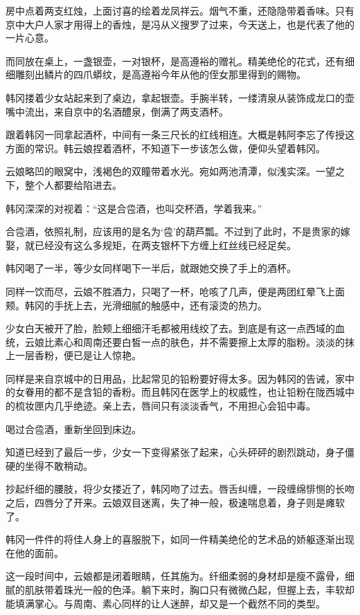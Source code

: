 房中点着两支红烛，上面讨喜的绘着龙凤祥云。烟气不重，还隐隐带着香味。只有京中大户人家才用得上的香烛，是冯从义搜罗了过来，今天送上，也是代表了他的一片心意。

而同放在桌上，一盏银壶，一对银杯，是高遵裕的赠礼。精美绝伦的花式，还有细细雕刻出鳞片的四爪蟒纹，是高遵裕今年从他的侄女那里得到的赐物。

韩冈搂着少女站起来到了桌边，拿起银壶。手腕半转，一缕清泉从装饰成龙口的壶嘴中流出，来自京中的名酒醴泉，倒满了两支酒杯。

跟着韩冈一同拿起酒杯，中间有一条三尺长的红线相连。大概是韩阿李忘了传授这方面的常识。韩云娘捏着酒杯，不知道下一步该怎么做，便仰头望着韩冈。

云娘略凹的眼窝中，浅褐色的双瞳带着水光。宛如两池清潭，似浅实深。一望之下，整个人都要给陷进去。

韩冈深深的对视着：“这是合卺酒，也叫交杯酒，学着我来。”

合卺酒，依照礼制，应该用的是名为‘卺’的葫芦瓢。不过到了此时，不是贵家的嫁娶，就已经没有这么多规矩，在两支银杯下方缠上红丝线已经足矣。

韩冈喝了一半，等少女同样喝下一半后，就跟她交换了手上的酒杯。

同样一饮而尽，云娘不胜酒力，只喝了一杯，呛咳了几声，便是两团红晕飞上面颊。韩冈的手抚上去，光滑细腻的触感中，还有滚烫的热力。

少女白天被开了脸，脸颊上细细汗毛都被用线绞了去。到底是有这一点西域的血统，云娘比素心和周南还要白皙一点的肤色，并不需要擦上太厚的脂粉。淡淡的抹上一层香粉，便已是让人惊艳。

同样是来自京城中的日用品，比起常见的铅粉要好得太多。因为韩冈的告诫，家中的女眷用的都不是含铅的香粉。而且韩冈在医学上的权威性，也让铅粉在陇西城中的梳妆匣内几乎绝迹。亲上去，唇间只有淡淡香气，不用担心会铅中毒。

喝过合卺酒，重新坐回到床边。

知道已经到了最后一步，少女一下变得紧张了起来，心头砰砰的剧烈跳动，身子僵硬的坐得不敢稍动。

抄起纤细的腰肢，将少女搂近了，韩冈吻了过去。唇舌纠缠，一段缠绵悱恻的长吻之后，四唇分了开来。云娘双目迷离，失了神一般，极速喘息着，身子则是瘫软了。

韩冈一件件的将佳人身上的喜服脱下，如同一件精美绝伦的艺术品的娇躯逐渐出现在他的面前。

这一段时间中，云娘都是闭着眼睛，任其施为。纤细柔弱的身材却是瘦不露骨，细腻的肌肤带着珠光一般的色泽。躺下来时，胸口只有微微凸起，但握上去，丰软却能填满掌心。与周南、素心同样的让人迷醉，却又是一个截然不同的类型。


